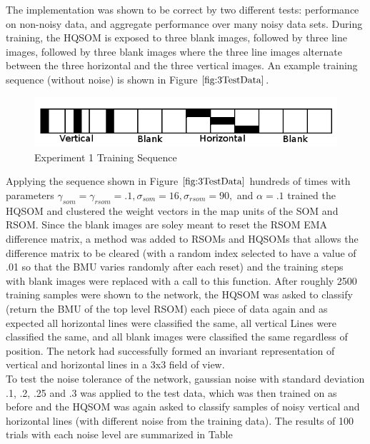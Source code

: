 \documentclass[a4paper,10pt]{article}
\begin{document}
The implementation was shown to be correct by two different tests: performance on non-noisy
data, and aggregate performance over many noisy data sets. During training, the HQSOM is exposed to
three blank images, followed by three line images, followed by three blank images where the three
line images alternate between the three horizontal and the three vertical images. An example
training sequence (without noise) is shown in Figure $\ref{fig:3TestData}$.
\begin{figure}[ht]
\begin{center} 
 \includegraphics[scale=.3]{./exp1_dataset.png}
\end{center} 
\caption{Experiment 1 Training Sequence}
\label{fig:3TestData}
\end{figure} 
Applying the sequence shown in Figure $\ref{fig:3TestData}$ hundreds of times with parameters
$\gamma_{som} = \gamma_{rsom} = .1, \sigma_{som}=16, \sigma_{rsom}=90,$ and $ \alpha = .1$
trained the HQSOM and clustered the weight vectors in the map units of the SOM and RSOM. Since the
blank images are soley meant to reset the RSOM EMA difference matrix, a method was added to RSOMs
and HQSOMs that allows the difference matrix to be cleared (with a random index selected to have a
value of .01 so that the BMU varies randomly after each reset) and the training steps with blank
images were replaced with a call to this function. After roughly 2500 training samples were shown to
the network, the HQSOM was asked to classify (return the BMU of the top level RSOM) each piece of
data again and as expected all horizontal lines were classified the same, all vertical Lines were
classified the same, and all blank images were classified the same regardless of position.  The
netork had successfully formed an invariant representation of vertical and horizontal lines in a 3x3
field of view.
\\
To test the noise tolerance of the network, gaussian noise with standard deviation .1, .2, .25 and
.3 was applied to the test data, which was then trained on as before and the HQSOM was again asked
to classify samples of noisy vertical and horizontal lines (with different noise from the training
data).  The results of 100 trials with each noise level are summarized in Table
\end{document}
